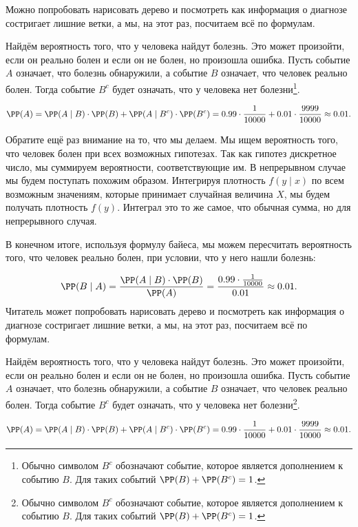 \documentclass[12pt, a4paper, oneside]{article}
\begin{document}
\begin{sol}
Можно попробовать нарисовать дерево и посмотреть как информация о диагнозе состригает лишние ветки, а мы, на этот раз, посчитаем всё по формулам.

Найдём вероятность того, что у человека найдут болезнь. Это может произойти, если он реально болен и если он не болен, но произошла ошибка.  Пусть событие $A$ означает, что болезнь обнаружили, а событие $B$ означает, что человек реально болен.  Тогда событие $B^{c}$ будет означать, что у человека нет болезни\footnote{Обычно символом $B^c$ обозначают событие, которое является дополнением к событию $B$. Для таких событий $\PP(B) + \PP(B^c) = 1$.}. 

\begin{multline*}
\PP(A)  = \PP(A\mid B) \cdot \PP(B) + \PP(A \mid B^{c})  \cdot \PP(B^{c})  = 0.99 \cdot \frac{1}{10000} + 0.01 \cdot \frac{9999}{10000} \approx 0.01.
\end{multline*}

Обратите ещё раз внимание на то, что мы делаем. Мы ищем вероятность того, что человек болен при всех возможных гипотезах. Так как гипотез дискретное число, мы суммируем вероятности, соответствующие им.  В непрерывном случае мы будем поступать похожим образом.  Интегрируя плотность $f(y \mid x)$ по всем возможным значениям, которые принимает случайная величина $X$, мы будем получать плотность $f(y)$. Интеграл это то же самое, что обычная сумма, но для непрерывного случая.

В конечном итоге, используя формулу байеса, мы можем пересчитать вероятность того, что человек реально болен, при условии, что у него нашли болезнь:

\[  \PP(B \mid A) = \frac{ \PP(A \mid B)\cdot \PP(B) }{\PP(A)}  = \frac{0.99 \cdot \frac{1}{10000}}{0.01} \approx 0.01. \]Читатель может попробовать нарисовать дерево и посмотреть как информация о диагнозе состригает лишние ветки, а мы, на этот раз, посчитаем всё по формулам.

Найдём вероятность того, что у человека найдут болезнь. Это может произойти, если он реально болен и если он не болен, но произошла ошибка.  Пусть событие $A$ означает, что болезнь обнаружили, а событие $B$ означает, что человек реально болен.  Тогда событие $B^{c}$ будет означать, что у человека нет болезни\footnote{Обычно символом $B^c$ обозначают событие, которое является дополнением к событию $B$. Для таких событий $\PP(B) + \PP(B^c) = 1$.}. 

\begin{multline*}
\PP(A)  = \PP(A\mid B) \cdot \PP(B) + \PP(A \mid B^{c})  \cdot \PP(B^{c})  = 0.99 \cdot \frac{1}{10000} + 0.01 \cdot \frac{9999}{10000} \approx 0.01.
\end{multline*}


\end{sol}
\end{document}
